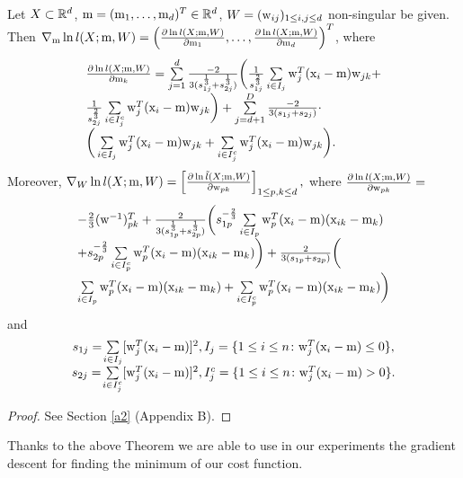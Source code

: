 \begin{theorem}\label{ther:grad}
Let $X \subset \mathbb{R}^d$, $\mathrm{m} = (\mathrm{m}_1, \ldots, \mathrm{m}_d)^T \in \mathbb{R}^d$, $W = (\mathrm{w}_{ij})_{1 \leq i,j \leq d}$ non-singular be given. 
Then
$\nabla_{\mathrm{m}}  \ln {l}(X;\mathrm{m},W) = \left(  \frac{\partial \ln {l}(X;\mathrm{m},W)}{\partial \mathrm{m}_1}, \ldots, \frac{\partial \ln {l}(X;\mathrm{m},W)}{\partial \mathrm{m}_d} \right)^T$,
where
$$
\begin{array}{l}
\frac{\partial \ln {l(X;\m,W)}}{\partial \m_k} =\sum\limits_{j=1}^d \frac{-2}{3({s}_{1j}^{\frac{1}{3}} + {s}_{2j}^{\frac{1}{3}})} \bigg(
\frac{1}{{s}_{1j}^{\frac{2}{3}}} \sum\limits_{i \in I_j} \w_j^T (\x_i - \m)  \w_{jk} + \\[6pt]
\frac{1}{{s}_{2j}^{\frac{2}{3}}} \sum\limits_{i \in I_j^c} \w_j^T (\x_i - \m) \w_{jk}
\bigg)+ %
\sum\limits_{j=d+1}^D \frac{-2}{3(s_{1j}+s_{2j})} \cdot \\[6pt]\bigg(
 \sum\limits_{i \in I_j} \w_j^T (\x_i - \m)  \w_{jk} + %
 \sum\limits_{i \in I_j^c} \w_j^T (\x_i - \m) \w_{jk}
\bigg)
.
\end{array}
$$
Moreover,
$
\nabla_{W} \ln {l}(X;\mathrm{m},W) = \left[ \frac{\partial \ln \tilde{l}(X;\mathrm{m},W)}{\partial \mathrm{w}_{pk}}  \right]_{1 \leq p,k \leq d},
$
where $\frac{\partial \ln {l(X;\mathrm{m},W)}}{\partial \mathrm{w}_{pk}} =$
$$
\begin{array}{l}
 -\frac{2}{3} (\mathrm{w}^{-1})^T_{pk} + \frac{2}{3({s}_{1p}^{\frac{1}{3}} +{s}_{2p}^{\frac{1}{3}})} 
 \bigg(
{s}_{1p}^{-\frac{2}{3}} \sum\limits_{ i \in {I}_p} \mathrm{w}^T_p (\mathrm{x}_i - \mathrm{m}) (\mathrm{x}_{ik} - \mathrm{m}_k)\\[6pt]
+ {s}_{2p}^{-\frac{2}{3}} \sum\limits_{ i \in {I}_p^c} \mathrm{w}^T_p (\mathrm{x}_i - \mathrm{m}) (\mathrm{x}_{ik} - \mathrm{m}_k) \bigg)+ \frac{2}{ 3(s_{1p}+s_{2p}) } \bigg( \\[6pt]
\sum\limits_{ i \in {I}_p} \mathrm{w}^T_p (\mathrm{x}_i - \mathrm{m}) (\mathrm{x}_{ik} - \mathrm{m}_k) + \sum\limits_{ i \in {I}_p^c} \mathrm{w}^T_p (\mathrm{x}_i - \mathrm{m}) (\mathrm{x}_{ik} - \mathrm{m}_k) \bigg)
\end{array}
$$
and
$$
\begin{array}{c}
{s}_{1j}= \! \sum\limits_{i \in I_j}[ \mathrm{w}_{j}^T (\mathrm{x}_i-\mathrm{m})]^2, {I}_j=\{ 1 \leq i \leq n \colon \mathrm{w}_{j}^T (\mathrm{x}_i-\mathrm{m}) \leq 0 \},
\\[1ex]
{s}_{2j}= \! \sum\limits_{i \in I_j^c}[ \mathrm{w}_{j}^T (\mathrm{x}_i-\mathrm{m})]^2,  {I}_j^c=\{ 1 \leq i \leq n \colon  \mathrm{w}_{j}^T (\mathrm{x}_i-\mathrm{m}) > 0 \}.
\end{array}
$$
\end{theorem}

\begin{proof}
See Section \ref{a2} (Appendix B).
\end{proof}


Thanks to the above Theorem we are able to use in our experiments the gradient descent for finding the minimum of our cost function.


